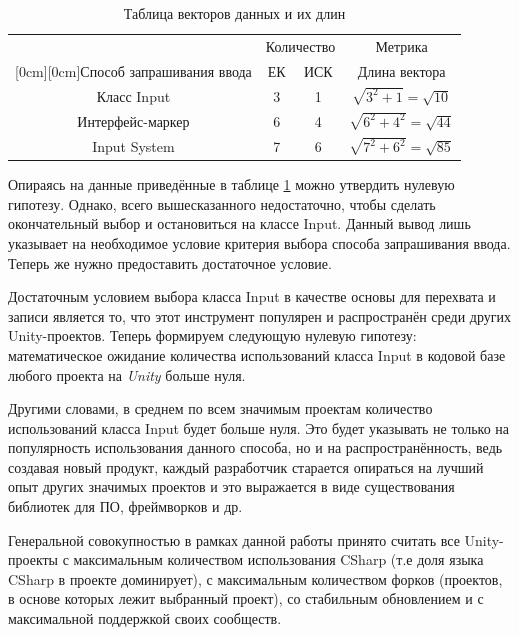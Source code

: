 \begin{table}[H]
	\caption{\label{tab:inputs}Таблица векторов данных и их длин}
	\begin{center}
		\begin{tabular}{|c|c|c|c|}
			\hline
			& \multicolumn{2}{c|}{Количество} & Метрика \\
			\cline{2-4}
			\raisebox{1.5ex}[0cm][0cm]{Способ запрашивания ввода}
			& ЕК & ИСК & Длина вектора \\
			\hline
			Класс Input & 3 & 1 & $\sqrt{3^2+1} = \sqrt{10}$ \\
			\hline
			Интерфейс-маркер & 6 & 4 & $\sqrt{6^2+4^2} = \sqrt{44}$ \\
			\hline
			Input System & 7 & 6 & $\sqrt{7^2+6^2} = \sqrt{85}$ \\
			\hline
		\end{tabular}
	\end{center}
\end{table}

Опираясь на данные приведённые в таблице \ref{tab:inputs} можно утвердить нулевую гипотезу. Однако, всего вышесказанного недостаточно, чтобы сделать окончательный выбор и остановиться на классе Input. Данный вывод лишь указывает на необходимое условие критерия выбора способа запрашивания ввода. Теперь же нужно предоставить достаточное условие.

Достаточным условием выбора класса Input в качестве основы для перехвата и записи является то, что этот инструмент популярен и распространён среди других Unity-проектов. Теперь формируем следующую нулевую гипотезу: математическое ожидание количества использований класса Input в кодовой базе любого проекта на \textit{Unity} больше нуля.

Другими словами, в среднем по всем значимым проектам количество использований класса Input будет больше нуля. Это будет указывать не только на популярность использования данного способа, но и на распространённость, ведь создавая новый продукт, каждый разработчик старается опираться на лучший опыт других значимых проектов и это выражается в виде существования библиотек для ПО, фреймворков и др.

Генеральной совокупностью в рамках данной работы принято считать все Unity-проекты с максимальным количеством использования CSharp (т.е доля языка CSharp в проекте доминирует), с максимальным количеством форков (проектов, в основе которых лежит выбранный проект), со стабильным обновлением и с максимальной поддержкой своих сообществ. 

